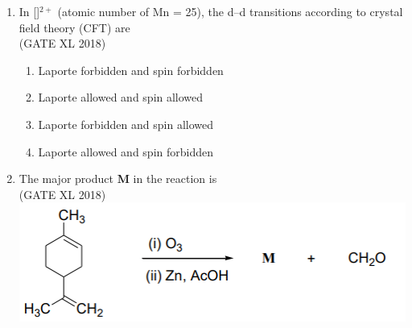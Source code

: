 \documentclass[14pt]{extarticle}
\begin{document}
\begin{flushleft}
\begin{enumerate}
\item In []$^{2+}$ (atomic number of Mn = 25), the d–d transitions according to crystal field theory (CFT) are\\
\hfill (GATE XL 2018)\\
\begin{enumerate}[label=(\Alph*)]
\item Laporte forbidden and spin forbidden
\item Laporte allowed and spin allowed
\item Laporte forbidden and spin allowed
\item Laporte allowed and spin forbidden
\end{enumerate}

\item The major product \textbf{M} in the reaction is\\
\hfill (GATE XL 2018)\\
\includegraphics[scale=1]{fig3.png}\\
\begin{enumerate}[label=(\Alph*)]
\end{enumerate}
\end{enumerate}
\end{flushleft}
\end{document}
